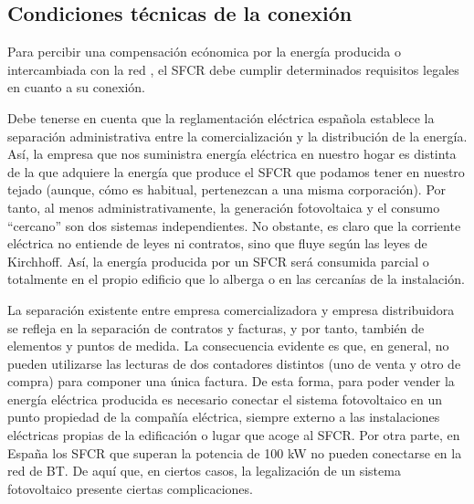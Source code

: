 \subsection{Condiciones técnicas de la conexión}
\label{sub:Condiciones-tecnicas-Conexion}

Para percibir una compensación ecónomica por la energía producida o
intercambiada con la red , el SFCR debe cumplir determinados
requisitos legales en cuanto a su conexión.

Debe tenerse en cuenta que la reglamentación eléctrica española
establece la separación administrativa entre la comercialización y la
distribución de la energía. Así, la empresa que nos suministra energía
eléctrica en nuestro hogar es distinta de la que adquiere la energía
que produce el SFCR que podamos tener en nuestro tejado (aunque, cómo
es habitual, pertenezcan a una misma corporación). Por tanto, al menos
administrativamente, la generación fotovoltaica y el consumo
``cercano'' son dos sistemas independientes. No obstante, es claro que
la corriente eléctrica no entiende de leyes ni contratos, sino que
fluye según las leyes de Kirchhoff. Así, la energía producida por un
SFCR será consumida parcial o totalmente en el propio edificio que lo
alberga o en las cercanías de la instalación.

La separación existente entre empresa comercializadora y empresa
distribuidora se refleja en la separación de contratos y facturas, y
por tanto, también de elementos y puntos de medida. La consecuencia
evidente es que, en general, no pueden utilizarse las lecturas de dos
contadores distintos (uno de venta y otro de compra) para componer una
única factura. De esta forma, para poder vender la energía eléctrica
producida es necesario conectar el sistema fotovoltaico en un punto
propiedad de la compañía eléctrica, siempre externo a las
instalaciones eléctricas propias de la edificación o lugar que acoge
al SFCR. Por otra parte, en España los SFCR que superan la potencia de
100 kW no pueden conectarse en la red de BT. De aquí que, en ciertos
casos, la legalización de un sistema fotovoltaico presente ciertas
complicaciones.

